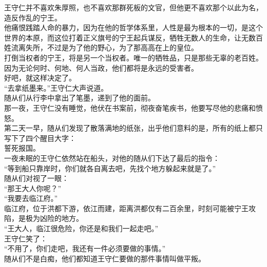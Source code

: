 \begin{multicols}{\theparacolNo}
王守仁并不喜欢朱厚照，也不喜欢那群死板的文官，但他更不喜欢那个以此为名，造反作乱的宁王。\\

他痛恨践踏人命的暴力，因为在他的哲学体系里，人性是最为根本的一切，是这个世界的本原，而这位打着正义旗号的宁王起兵谋反，牺牲无数人的生命，让无数百姓流离失所，不过是为了他的野心，为了那高高在上的皇位。\\

打倒当权者的宁王，将是另一个当权者。唯一的牺牲品，只是那些无辜的老百姓。因为无论何时、何地、何人当政，他们都将是永远的受害者。\\

好吧，就这样决定了。\\

“去拿纸墨来。”王守仁大声说道。\\

随从们从行李中拿出了笔墨，递到了他的面前。\\

那一夜，王守仁没有睡觉，他伏在书案前，彻夜奋笔疾书，他要写尽他的悲痛和愤怒。\\

第二天一早，随从们发现了散落满地的纸张，出乎他们意料的是，所有的纸上都只写下了四个醒目大字：\\

誓死报国。\\

一夜未眠的王守仁依然站在船头，对他的随从们下达了最后的指令：\\

“等到船只靠岸时，你们就各自离去吧，先找个地方躲起来就是了。”\\

随从们对视了一眼：\\

“那王大人你呢？”\\

“我要去临江府。”\\

临江府，位于洪都下游，依江而建，距离洪都仅有二百余里，时刻可能被宁王攻陷，是极为凶险的地方。\\

“王大人，临江很危险，你还是和我们一起走吧。”\\

王守仁笑了：\\

“不用了，你们走吧，我还有一件必须要做的事情。”\\

随从们不是白痴，他们都知道王守仁要做的那件事情叫做平叛。\\


\end{multicols}

